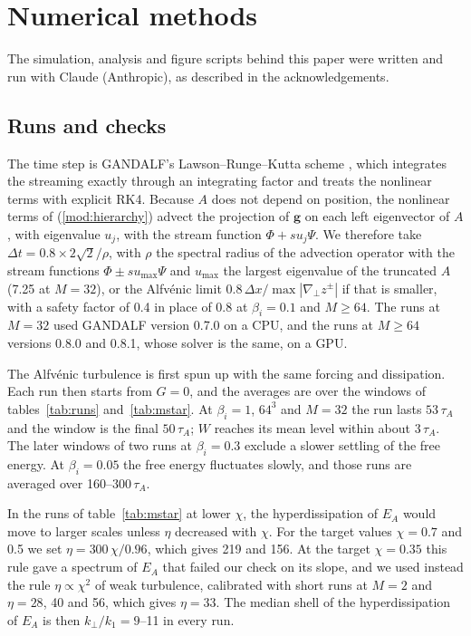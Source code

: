 \section{Numerical methods}\label{app:methods}

The simulation, analysis and figure scripts behind this paper were written and run with Claude (Anthropic), as described in the acknowledgements.

\subsection{Runs and checks}\label{app:runs}

The time step is GANDALF's Lawson--Runge--Kutta scheme \citep[Lawson-RK4;][]{Lawson1967}, which integrates the streaming exactly through an integrating factor and treats the nonlinear terms with explicit RK4. Because $A$ does not depend on position, the nonlinear terms of (\ref{mod:hierarchy}) advect the projection of $\boldsymbol g$ on each left eigenvector of $A$, with eigenvalue $u_j$, with the stream function $\Phi+su_j\Psi$. We therefore take $\Delta t=0.8\times2\sqrt2/\rho$, with $\rho$ the spectral radius of the advection operator with the stream functions $\Phi\pm su_{\max}\Psi$ and $u_{\max}$ the largest eigenvalue of the truncated $A$ (7.25 at $M=32$), or the Alfv\'enic limit $0.8\,\Delta x/\max|\nabla_\perp z^\pm|$ if that is smaller, with a safety factor of 0.4 in place of 0.8 at $\beta_i=0.1$ and $M\ge64$. The runs at $M=32$ used GANDALF version 0.7.0 on a CPU, and the runs at $M\ge64$ versions 0.8.0 and 0.8.1, whose solver is the same, on a GPU.

The Alfv\'enic turbulence is first spun up with the same forcing and dissipation. Each run then starts from $G=0$, and the averages are over the windows of tables~\ref{tab:runs} and~\ref{tab:mstar}. At $\beta_i=1$, $64^3$ and $M=32$ the run lasts $53\,\tau_A$ and the window is the final $50\,\tau_A$; $W$ reaches its mean level within about $3\,\tau_A$. The later windows of two runs at $\beta_i=0.3$ exclude a slower settling of the free energy. At $\beta_i=0.05$ the free energy fluctuates slowly, and those runs are averaged over 160--$300\,\tau_A$.

In the runs of table~\ref{tab:mstar} at lower $\chi$, the hyperdissipation of $E_A$ would move to larger scales unless $\eta$ decreased with $\chi$. For the target values $\chi=0.7$ and 0.5 we set $\eta=300\,\chi/0.96$, which gives 219 and 156. At the target $\chi=0.35$ this rule gave a spectrum of $E_A$ that failed our check on its slope, and we used instead the rule $\eta\propto\chi^2$ of weak turbulence, calibrated with short runs at $M=2$ and $\eta=28$, 40 and 56, which gives $\eta=33$. The median shell of the hyperdissipation of $E_A$ is then $k_\perp/k_1=9$--11 in every run.

